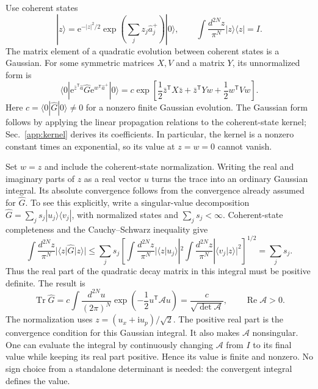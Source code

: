 \documentclass[11pt,a4paper]{article}
\newcommand{\Tr}{\operatorname{Tr}}
\newcommand{\ee}{\mathrm e}
\newcommand{\ii}{\mathrm i}
\newcommand{\trans}{\mathsf T}
\numberwithin{equation}{section}
\begin{document}
Use coherent states
\begin{equation}
 |z\rangle=\ee^{-|z|^2/2}
 \exp\!\left(\sum_jz_j\hat a_j^+\right)|0\rangle,
 \qquad
 \int\frac{d^{2N}z}{\pi^N}|z\rangle\langle z|=I.
 \label{eq:coherent_states}
\end{equation}
The matrix element of a quadratic evolution between coherent states is a
Gaussian. For some symmetric matrices $X,V$ and a matrix $Y$, its unnormalized
form is
\begin{equation}
 \langle0|\ee^{\bar z^\trans\hat a}\hat G
 \ee^{w^\trans\hat a^+}|0\rangle
 =c\exp\!\left[
 \frac12\bar z^\trans X\bar z+\bar z^\trans Yw
 +\frac12w^\trans Vw\right].
 \label{eq:gaussian_kernel}
\end{equation}
Here $c=\langle0|\hat G|0\rangle\ne0$ for a nonzero finite Gaussian
evolution. The Gaussian form follows by applying the linear propagation
relations to the coherent-state kernel; Sec.~\ref{app:kernel} derives
its coefficients. In particular, the kernel is a nonzero constant times
an exponential, so its value at $z=w=0$ cannot vanish.

Set $w=z$ and include the coherent-state normalization. Writing the real and
imaginary parts of $z$ as a real vector $u$ turns the trace into an ordinary
Gaussian integral. Its absolute convergence follows from the convergence
already assumed for $\hat G$. To see this explicitly, write a singular-value
decomposition $\hat G=\sum_j s_j|u_j\rangle\langle v_j|$, with normalized
states and $\sum_j s_j<\infty$. Coherent-state completeness and the
Cauchy--Schwarz inequality give
\begin{equation}
 \int\frac{d^{2N}z}{\pi^N}|\langle z|\hat G|z\rangle|
 \leq\sum_j s_j
 \left[\int\frac{d^{2N}z}{\pi^N}|\langle z|u_j\rangle|^2
       \int\frac{d^{2N}z}{\pi^N}|\langle v_j|z\rangle|^2\right]^{1/2}
 =\sum_j s_j.
 \label{eq:coherent_absolute}
\end{equation}
Thus the real part of the quadratic decay matrix in this integral must be
positive definite. The result is
\begin{equation}
 \Tr\hat G
 =c\int\frac{d^{2N}u}{(2\pi)^N}
       \exp\!\left(-\frac12u^\trans\mathcal A u\right)
 =\frac{c}{\sqrt{\det\mathcal A}},
 \qquad \operatorname{Re}\mathcal A>0.
 \label{eq:gaussian_integral}
\end{equation}
The normalization uses $z=(u_x+\ii u_p)/\sqrt2$. The positive real part is
the convergence condition for this Gaussian integral. It also makes
$\mathcal A$ nonsingular. One can evaluate the integral by continuously
changing $\mathcal A$ from $I$ to its final value while keeping its real
part positive. Hence its value is finite and nonzero. No sign choice from a
standalone determinant is needed: the convergent integral defines the value.
\end{document}
